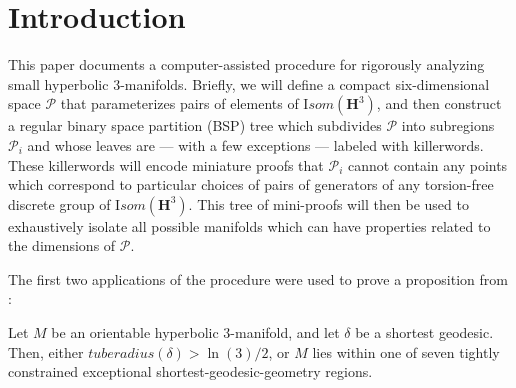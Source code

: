 \def\Arccosh{{\mathrm Arccosh}}
\chapter{Introduction}

This paper documents a computer-assisted procedure
for rigorously analyzing small hyperbolic $3$-manifolds.
Briefly, we will define a compact six-dimensional space ${\mathcal P}$
that parameterizes pairs of elements of ${\mathrm Isom}({\mathbf H}^3)$,
and then construct a regular binary space partition (BSP) tree
which subdivides ${\mathcal P}$ into subregions ${\mathcal P_i}$
and whose leaves are --- with a few exceptions --- labeled with killerwords.
These killerwords will encode miniature proofs that ${\mathcal P_i}$
cannot contain any points which correspond to
particular choices of pairs of generators of
any torsion-free discrete group of ${\mathrm Isom}({\mathbf H}^3)$.
This tree of mini-proofs will then be used
to exhaustively isolate all possible manifolds
which can have properties related to the dimensions of ${\mathcal P}$.

The first two applications of the procedure
were used to prove a proposition from \cite{GMT}:

\begin{proposition}{\cite{GMT}}
Let $M$ be an orientable hyperbolic $3$-manifold, and let $\delta$ be
a shortest geodesic. Then, either ${\mathit tuberadius}(\delta) > \ln(3)/2$,
or $M$ lies within one of seven tightly constrained
exceptional shortest-geodesic-geometry regions.
\end{proposition}

